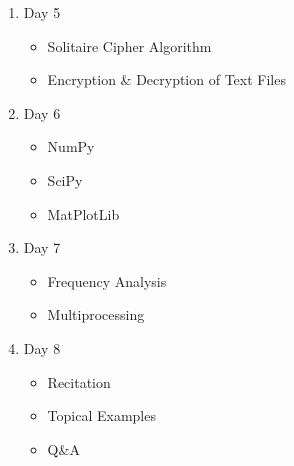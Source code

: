 \documentclass[11pt,letterpaper]{article}
\begin{document}
\begin{enumerate}
    \item{Day 5}
    \begin{itemize}
    \item{Solitaire Cipher Algorithm}
    \item{Encryption \& Decryption of Text Files}
    \end{itemize}

    \item{Day 6}
    \begin{itemize}
    \item{NumPy}
    \item{SciPy}
    \item{MatPlotLib}
    \end{itemize}

    \item{Day 7}
    \begin{itemize}
    \item{Frequency Analysis}
    \item{Multiprocessing}
    \end{itemize}

    \item{Day 8}
    \begin{itemize}
    \item{Recitation}
    \item{Topical Examples}
    \item{Q\&A}
    \end{itemize}
    
\end{enumerate}
\end{document}

